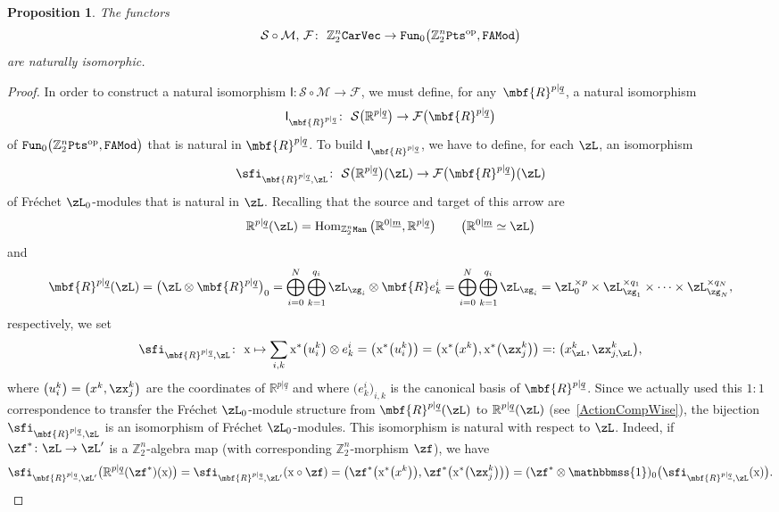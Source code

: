 \documentclass[pdftex]{sigma}%
\newcommand{\Id}{\mathbbmss{1}}
\newcommand{\op}[1]{\operatorname{#1}}
\newcommand{\R}{{\mathbb R}}
\newcommand{\Z}{{\mathbb Z}}
\def\ul{\underline}
\def\cM{\cal M}
\def\cF{\mathcal{F}}
\def\cM{\mathcal{M}}
\def\ul{\underline}
\newcommand{\0}{\otimes}
\newcommand{\z}{\Z_2^n}
\numberwithin{equation}{section}
\newtheorem{Proposition}[Theorem]{Proposition}
 { \theoremstyle{definition}
\newtheorem{Definition}[Theorem]{Definition}
\newtheorem{Example}[Theorem]{Example}
\newtheorem{Remark}[Theorem]{Remark} }
\begin{document}
\begin{Proposition}%
The functors
\[
\mathcal{S}\circ\cM,\, \cF\colon\ \z{\tt CarVec}\to{\tt Fun}_0\big(\z{\tt Pts}^{\op{op}},{\tt FAMod}\big)
\]
are naturally isomorphic.
\end{Proposition}

\newcommand{\rmx}{\mathrm{x}}

\begin{proof}
In order to construct a natural isomorphism $\textsf{I}\colon \mathcal{S}\circ\cM\to\cF$, we must define, for any~$\mbf{R}^{p|\ul q}$, a natural isomorphism
\[
\textsf{I}_{\mbf{R}^{p|\ul q}}\colon\ \mathcal{S}\big(\R^{p|\ul q}\big)\to\cF\big(\mbf{R}^{p|\ul q}\big)
\]
of ${\tt Fun}_0\big(\z{\tt Pts}^{\op{op}},{\tt FAMod}\big)$ that is natural in $\mbf{R}^{p|\ul q}$. To build $\textsf{I}_{\mbf{R}^{p|\ul q}}$, we have to define, for each $\zL$, an isomorphism
\[
\sfi_{\mbf{R}^{p|\ul q},\zL}\colon\ \mathcal{S}\big(\R^{p|\ul q}\big)(\zL)\to \cF\big(\mbf{R}^{p|\ul q}\big)(\zL)
\]
of Fr\'echet $\zL_0$-modules that is natural in $\zL$. Recalling that the source and target of this arrow are
\[
\R^{p|\ul q}(\zL)=\op{Hom}_{\z\tt Man}\big(\R^{0|\ul m},\R^{p|\ul q}\big)\qquad \big(\R^{0|\ul m}\simeq\zL\big)
\]
and
\[
\mbf{R}^{p|\ul q}(\zL)=\big(\zL\0\mbf{R}^{p|\ul q}\big)_0=\bigoplus_{i=0}^N\bigoplus_{k=1}^{q_i}\zL_{\zg_i}\0\mbf{R}e^i_k =\bigoplus_{i=0}^N\bigoplus_{k=1}^{q_i}\zL_{\zg_i}=\zL_0^{\times p}\times\zL_{\zg_1}^{\times q_1}\times\cdots\times\zL_{\zg_N}^{\times q_N},
\]
respectively, we set
\[
\sfi_{\mbf{R}^{p|\ul q},\zL}\colon\ \rmx\mapsto \sum_{i,k}\rmx^*\big(u^k_i\big)\0 e^i_k=\big(\rmx^*\big(u^k_i\big)\big)=\big(\rmx^*\big(x^k\big),\rmx^*\big(\zx^k_j\big)\big) =:\big(x^k_\zL,\zx^k_{j,\zL}\big),
\]
where $\big(u^k_i\big)=\big(x^k,\zx^k_j\big)$ are the coordinates of $\R^{p|\ul q}$ and where $\big(e^i_k\big)_{i,k}$ is the canonical basis of $\mbf{R}^{p|\ul q}$. Since we actually used this $1:1$ correspondence to transfer the Fr\'echet $\zL_0$-module structure from $\mbf{R}^{p|\ul q}(\zL)$ to $\R^{p|\ul q}(\zL)$ (see~\eqref{ActionCompWise}), the bijection $\sfi_{\mbf{R}^{p|\ul q},\zL}$ is an isomorphism of Fr\'echet $\zL_0$-modules. This isomorphism is natural with respect to $\zL$. Indeed, if $\zf^*\colon \zL\to\zL'$ is a $\z$-algebra map (with corresponding $\z$-morphism $\zf$), we have
\begin{gather*}
\sfi_{\mbf{R}^{p|\ul q},\zL'}\big(\R^{p|\ul q}(\zf^*)(\rmx)\big)=\sfi_{\mbf{R}^{p|\ul q},\zL'}(\rmx\circ\zf)=\big(\zf^*\big(\rmx^*\big(x^k\big)\big),\zf^*\big(\rmx^*\big(\zx^k_j\big)\big)\big) =(\zf^*\0\Id)_0\big(\sfi_{\mbf{R}^{p|\ul q},\zL}(\rmx)\big).

\end{gather*}
\end{proof}
\end{document}
